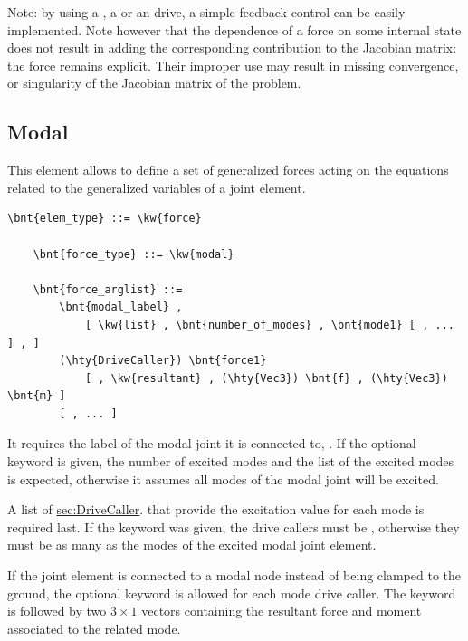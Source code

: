 \bigskip
Note: by using a , a  or an  drive,
a simple feedback control can be easily implemented.
Note however that the dependence of a force on some internal state
does not result in adding the corresponding contribution 
to the Jacobian matrix: the force remains explicit.
Their improper use may result in missing convergence,
or singularity of the Jacobian matrix of the problem.

\subsection{Modal}
\label{sec:EL:FORCE:MODAL}
This element allows to define a set of generalized forces
acting on the equations related to the generalized variables
of a  joint element.
\begin{Verbatim}[commandchars=\\\{\}]
    \bnt{elem_type} ::= \kw{force}

    \bnt{force_type} ::= \kw{modal}

    \bnt{force_arglist} ::=
        \bnt{modal_label} ,
            [ \kw{list} , \bnt{number_of_modes} , \bnt{mode1} [ , ... ] , ]
        (\hty{DriveCaller}) \bnt{force1}
            [ , \kw{resultant} , (\hty{Vec3}) \bnt{f} , (\hty{Vec3}) \bnt{m} ]
        [ , ... ]
\end{Verbatim}
It requires the label of the modal joint it is connected to,
.
If the optional keyword  is given, the number of excited modes
 and the list of the excited modes is expected,
otherwise it assumes all modes of the  modal joint
will be excited.

A list of
\hyperref{\kw{drive callers}}{\kw{drive callers} (see Section~}{)}{sec:DriveCaller}.
that provide the excitation value for each mode is required last.
If the keyword  was given, the drive callers
must be , otherwise they must be as many
as the modes of the excited modal joint element.

If the  joint element is connected to a modal node
instead of being clamped to the ground, the optional keyword 
is allowed for each mode drive caller.
The keyword  is followed by two $3\times 1$ vectors
containing the resultant force and moment associated to the related mode.

